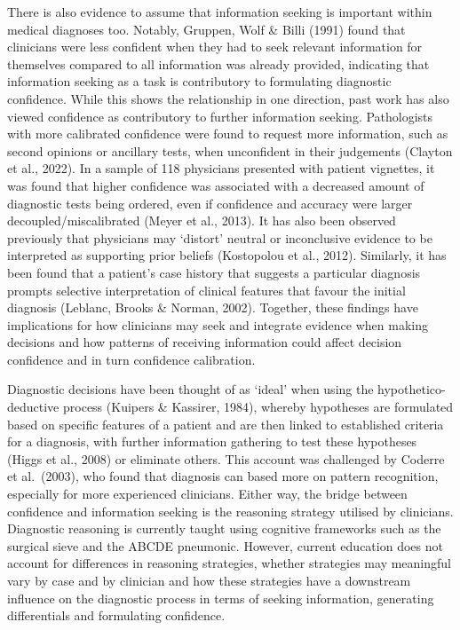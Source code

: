 \documentclass[a4paper, nobind]{templates/ociamthesis}
\begin{document}
There is also evidence to assume that information seeking is important within medical diagnoses too. Notably, Gruppen, Wolf \& Billi (1991) found that clinicians were less confident when they had to seek relevant information for themselves compared to all information was already provided, indicating that information seeking as a task is contributory to formulating diagnostic confidence. While this shows the relationship in one direction, past work has also viewed confidence as contributory to further information seeking. Pathologists with more calibrated confidence were found to request more information, such as second opinions or ancillary tests, when unconfident in their judgements (Clayton et al., 2022). In a sample of 118 physicians presented with patient vignettes, it was found that higher confidence was associated with a decreased amount of diagnostic tests being ordered, even if confidence and accuracy were larger decoupled/miscalibrated (Meyer et al., 2013). It has also been observed previously that physicians may `distort' neutral or inconclusive evidence to be interpreted as supporting prior beliefs (Kostopolou et al., 2012). Similarly, it has been found that a patient's case history that suggests a particular diagnosis prompts selective interpretation of clinical features that favour the initial diagnosis (Leblanc, Brooks \& Norman, 2002). Together, these findings have implications for how clinicians may seek and integrate evidence when making decisions and how patterns of receiving information could affect decision confidence and in turn confidence calibration.

Diagnostic decisions have been thought of as `ideal' when using the hypothetico-deductive process (Kuipers \& Kassirer, 1984), whereby hypotheses are formulated based on specific features of a patient and are then linked to established criteria for a diagnosis, with further information gathering to test these hypotheses (Higgs et al., 2008) or eliminate others. This account was challenged by Coderre et al.~(2003), who found that diagnosis can based more on pattern recognition, especially for more experienced clinicians. Either way, the bridge between confidence and information seeking is the reasoning strategy utilised by clinicians. Diagnostic reasoning is currently taught using cognitive frameworks such as the surgical sieve and the ABCDE pneumonic. However, current education does not account for differences in reasoning strategies, whether strategies may meaningful vary by case and by clinician and how these strategies have a downstream influence on the diagnostic process in terms of seeking information, generating differentials and formulating confidence.
\end{document}
